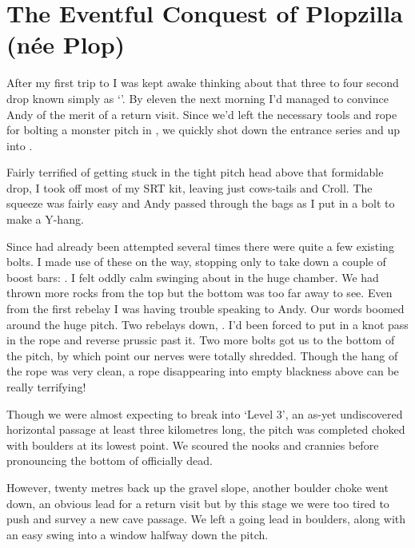 


\section{The Eventful Conquest of Plopzilla (née Plop)}

After my first trip to  I was kept awake thinking about that
three to four second drop known simply as `'. By eleven the next
morning I'd managed to convince Andy of the merit of a return visit.
Since we'd left the necessary tools and rope for bolting a monster pitch in , we quickly shot down the  entrance series and
up  into .

Fairly terrified of getting stuck in the tight pitch head above that
formidable drop, I took off most of my SRT kit, leaving just cows-tails
and Croll. The squeeze was fairly easy and Andy passed through the bags as I put in a bolt to make a Y-hang.

Since  had already been attempted several times there were quite a few existing bolts. I made use of these on the way, stopping only to take down a couple of boost bars: . I felt oddly calm swinging about in the huge chamber. We had thrown more rocks from the top but the bottom was too far away to see. Even from the first rebelay I was having trouble speaking to Andy. Our words boomed around the huge pitch. Two rebelays down, . I'd been forced to put in a knot pass in the rope and reverse prussic past it. Two more bolts got us to the bottom of the pitch, by which point our nerves were totally shredded.
Though the hang of the rope was very clean, a rope disappearing into
empty blackness above can be really terrifying!

Though we were almost expecting to break into `Level 3', an as-yet
undiscovered horizontal passage at least three kilometres long, the
pitch was completed choked with boulders at its lowest point. We scoured
the nooks and crannies before pronouncing the bottom of  officially
dead.

However, twenty metres back up the gravel slope, another boulder choke
went down, an obvious lead for a return visit but by this stage we were
too tired to push and survey a new cave passage. We left a going lead in
boulders, along with an easy swing into a window halfway down the pitch.

